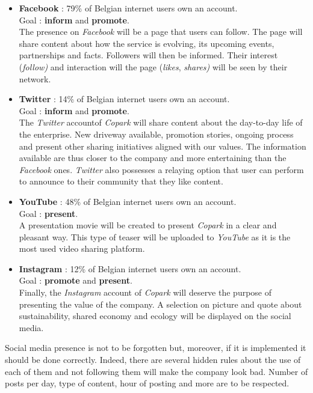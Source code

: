 \documentclass[12pt,a4paper,oneside]{book}
\newcommand{\bp}{\textit{Copark}}
\begin{document}
\begin{itemize}
\item \textbf{Facebook} : 79\% of Belgian internet users own an account.\\Goal : \textbf{inform} and \textbf{promote}.\\
The presence on \textit{Facebook} will be a page that users can follow. The page will share content about how the service is evolving, its upcoming events, partnerships and facts. Followers will then be informed. Their interest (\textit{follow)} and interaction will the page (\textit{likes}, \textit{shares)} will be seen by their network. 
\item \textbf{Twitter} : 14\% of Belgian internet users own an account.\\Goal : \textbf{inform} and \textbf{promote}.\\
The \textit{Twitter} accountof \bp{} will share content about the day-to-day life of the enterprise. New driveway available, promotion stories, ongoing process and present other sharing initiatives aligned with our values. The information available are thus closer to the company and more entertaining than the \textit{Facebook} ones. \textit{Twitter} also possesses a relaying option that user can perform to announce to their community that they like content.
\item \textbf{YouTube} : 48\% of Belgian internet users own an account.\\Goal : \textbf{present}.\\
A presentation movie will be created to present \bp{} in a clear and pleasant way. This type of teaser will be uploaded to \textit{YouTube} as it is the most used video sharing platform.
\item \textbf{Instagram} : 12\% of Belgian internet users own an account.\\Goal : \textbf{promote} and \textbf{present}.\\
Finally, the \textit{Instagram} account of \bp{} will deserve the purpose of presenting the value of the company. A selection on picture and quote about sustainability, shared economy and ecology will be displayed on the social media.
\end{itemize}

Social media presence is not to be forgotten but, moreover, if it is implemented it should be done correctly. Indeed, there are several hidden rules about the use of each of them and not following them will make the company look bad. Number of posts per day, type of content, hour of posting and more are to be respected.\cite{smrules}
\end{document}
